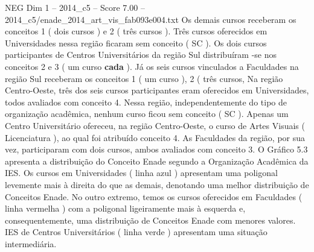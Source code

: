 \begin{textsample}{NEG Dim 1 – 2014\_c5 – Score 7.00 – 2014\_c5/enade\_2014\_art\_vis\_fab093e004.txt}
Os demais cursos receberam os conceitos 1 ( dois cursos ) e 2 ( três cursos ).
Três cursos oferecidos em Universidades nessa região ficaram sem conceito ( SC ).
Os dois cursos participantes de Centros Universitários da região Sul distribuíram -se nos conceitos 2 e 3 ( um curso \textbf{cada} ).
Já os seis cursos vinculados a Faculdades na região Sul receberam os conceitos 1 ( um curso ), 2 ( três cursos, Na região Centro-Oeste, três dos seis cursos participantes eram oferecidos em Universidades, todos avaliados com conceito 4.
Nessa região, independentemente do tipo de organização acadêmica, nenhum curso ficou sem conceito ( SC ).
Apenas um Centro Universitário ofereceu, na região Centro-Oeste, o curso de Artes Visuais ( Licenciatura ), ao qual foi atribuído conceito 4.
As Faculdades da região, por sua vez, participaram com dois cursos, ambos avaliados com conceito 3.
O Gráfico 5.3 apresenta a distribuição do Conceito Enade segundo a Organização Acadêmica da IES.
Os cursos em Universidades ( linha azul ) apresentam uma poligonal levemente mais à direita do que as demais, denotando uma melhor distribuição de Conceitos Enade.
No outro extremo, temos os cursos oferecidos em Faculdades ( linha vermelha ) com a poligonal ligeiramente mais à esquerda e, consequentemente, uma distribuição de Conceitos Enade com menores valores.
IES de Centros Universitários ( linha verde ) apresentam uma situação intermediária.

\end{textsample}
